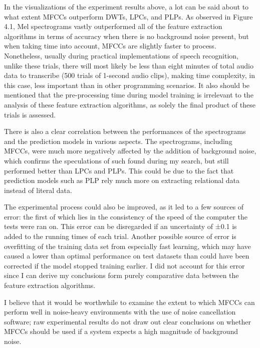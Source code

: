 In the visualizations of the experiment results above, a lot can be said about to what extent MFCCs outperform DWTs, LPCs, and PLPs. As observed in Figure 4.1, Mel spectrograms vastly outperformed all of the feature extraction algorithms in terms of accuracy when there is no background noise present, but when taking time into account, MFCCs are slightly faster to process. Nonetheless, usually during practical implementations of speech recognition, unlike these trials, there will most likely be less than eight minutes of total audio data to transcribe (500 trials of 1-second audio clips), making time complexity, in this case, less important than in other programming scenarios. It also should be mentioned that the pre-processing time during model training is irrelevant to the analysis of these feature extraction algorithms, as solely the final product of these trials is assessed.
\newline\par
There is also a clear correlation between the performances of the spectrograms and the prediction models in various aspects. The spectrograms, including MFCCs, were much more negatively affected by the addition of background noise, which confirms the speculations of such found during my search, but still performed better than LPCs and PLPs. This could be due to the fact that prediction models such as PLP rely much more on extracting relational data instead of literal data.
\newline\par
The experimental process could also be improved, as it led to a few sources of error: the first of which lies in the consistency of the speed of the computer the tests were ran on. This error can be disregarded if an uncertainty of ±0.1 is added to the running times of each trial. Another possible source of error is overfitting of the training data set from especially fast learning, which may have caused a lower than optimal performance on test datasets than could have been corrected if the model stopped training earlier. I did not account for this error since I can derive my conclusions form purely comparative data between the feature extraction algorithms.
\newline\par
I believe that it would be worthwhile to examine the extent to which MFCCs can perform well in noise-heavy environments with the use of noise cancellation software; raw experimental results do not draw out clear conclusions on whether MFCCs should be used if a system expects a high magnitude of background noise.

